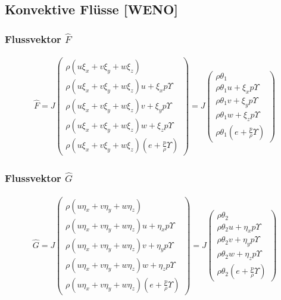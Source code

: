 \subsection{Konvektive Flüsse [WENO]}
\subsubsection{Flussvektor $\hat{F}$}
\begin{align*}
\hat{F}
=
J
\begin{pmatrix}
\rho \left(u \xi_x+v \xi_y +w \xi_z\right)
\\
\rho \left(u \xi_x+v \xi_y +w \xi_z\right) u +\xi_x p \Upsilon
\\
\rho \left(u \xi_x+v \xi_y +w \xi_z\right) v +\xi_y p \Upsilon
\\
\rho \left(u \xi_x+v \xi_y +w \xi_z\right) w +\xi_z p \Upsilon
\\
\rho \left(u \xi_x+v \xi_y +w \xi_z\right) \left( e+\frac{p}{\rho} \Upsilon\right)
\end{pmatrix}
=
J
\begin{pmatrix}
\rho \theta_1
\\
\rho \theta_1 u +\xi_x p \Upsilon
\\
\rho \theta_1 v +\xi_y p \Upsilon
\\
\rho \theta_1 w +\xi_z p \Upsilon
\\
\rho \theta_1 \left( e+\frac{p}{\rho} \Upsilon\right)
\end{pmatrix}
\end{align*}

\subsubsection{Flussvektor $\hat{G}$}
\begin{align*}
\hat{G}
=
J
\begin{pmatrix}
\rho \left(u \eta_x+v \eta_y +w \eta_z\right)
\\
\rho \left(u \eta_x+v \eta_y +w \eta_z\right) u +\eta_x p \Upsilon
\\
\rho \left(u \eta_x+v \eta_y +w \eta_z\right) v +\eta_y p \Upsilon
\\
\rho \left(u \eta_x+v \eta_y +w \eta_z\right) w +\eta_z p \Upsilon
\\
\rho \left(u \eta_x+v \eta_y +w \eta_z\right) \left( e+\frac{p}{\rho} \Upsilon\right)
\end{pmatrix}
=
J
\begin{pmatrix}
\rho \theta_2
\\
\rho \theta_2 u +\eta_x p \Upsilon
\\
\rho \theta_2 v +\eta_y p \Upsilon
\\
\rho \theta_2 w +\eta_z p \Upsilon
\\
\rho \theta_2 \left( e+\frac{p}{\rho} \Upsilon\right)
\end{pmatrix}
\end{align*}


